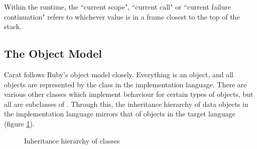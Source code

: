 Within the runtime, the ``current scope", ``current call" or ``current failure continuation" refers to whichever value is in a frame closest to the top of the stack.

\subsection{The Object Model}
\label{sec:object_model}

Carat follows Ruby's object model closely. Everything is an object, and all objects are represented by the class  in the implementation language. There are various other classes which implement behaviour for certain types of objects, but all are subclasses of . Through this, the inheritance hierarchy of data objects in the implementation language mirrors that of objects in the target language (figure \ref{fig:data_object_hierarchy}).

\begin{figure}
\begin{center}
\caption{Inheritance hierarchy of  classes}
\label{fig:data_object_hierarchy}
\end{center}
\end{figure}

\subsubsection{}

